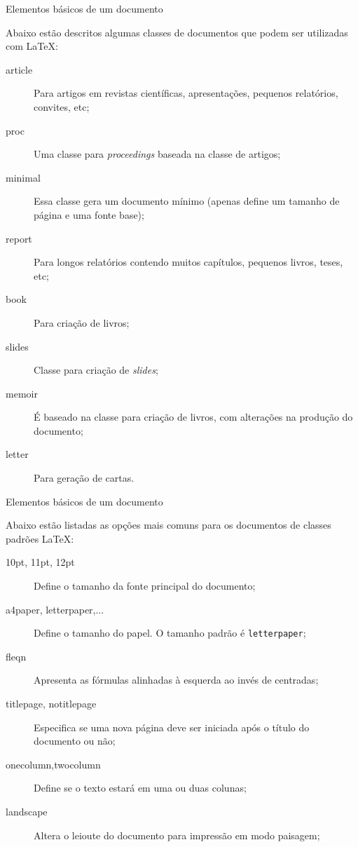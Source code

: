 \begin{frame}[fragile]{Elementos b\'asicos de um documento}

Abaixo est\~ao descritos algumas classes de documentos que podem ser utilizadas com \LaTeX:
\begin{description}
\item[article] Para artigos em revistas cient\'ificas, apresenta{\c c}\~oes, pequenos relat\'orios, convites, etc;
\item[proc] Uma classe para \textit{proceedings} baseada na classe de artigos;
\item[minimal] Essa classe gera um documento m\'inimo (apenas define um tamanho de p\'agina e uma fonte base);
\item[report] Para longos relat\'orios contendo muitos cap\'itulos, pequenos livros, teses, etc;
\item[book] Para cria{\c c}\~ao de livros;
\item[slides] Classe para cria{\c c}\~ao de \textit{slides};
\item[memoir] \'E baseado na classe para cria{\c c}\~ao de livros, com altera{\c c}\~oes na produ{\c c}\~ao do documento;
\item[letter] Para gera{\c c}\~ao de cartas. 
\end{description}
\end{frame}

\begin{frame}[fragile]{Elementos b\'asicos de um documento}

Abaixo est\~ao listadas as op{\c c}\~oes mais comuns para os documentos de classes padr\~oes \LaTeX:
\begin{description}
\item[10pt, 11pt, 12pt] Define o tamanho da fonte principal do documento;
\item[a4paper, letterpaper,...] Define o tamanho do papel. O tamanho padr\~ao \'e \texttt{letterpaper};
\item[fleqn] Apresenta as f\'ormulas alinhadas \`a esquerda ao inv\'es de centradas;
\item[titlepage, notitlepage] Especifica se uma nova p\'agina deve ser iniciada ap\'os o t\'itulo do documento ou n\~ao;
\item[onecolumn,twocolumn] Define se o texto estar\'a em uma ou duas colunas;
\item[landscape] Altera o leioute do documento para impress\~ao em modo paisagem;
\end{description}
\end{frame}


